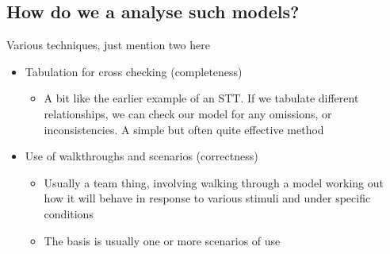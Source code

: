 \documentclass{article}[18pt]
\begin{document}
\subsection{How do we a analyse such models?}
Various techniques, just mention two here
\begin{itemize}
	\item Tabulation for cross checking (completeness)
	\begin{itemize}
		\item A bit like the earlier example of an STT. If we tabulate different relationships, we can check our model for any omissions, or inconsistencies. A simple but often quite effective method
	\end{itemize}
	\item Use of walkthroughs and scenarios (correctness)
	\begin{itemize}
		\item Usually a team thing, involving walking through a model working out how it will behave in response to various stimuli and under specific conditions
		\item The basis is usually one or more scenarios of use
	\end{itemize}
\end{itemize}
\end{document}
